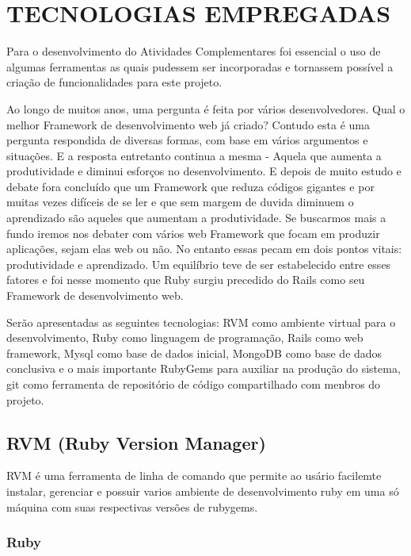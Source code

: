 \chapter{TECNOLOGIAS EMPREGADAS}
\thispagestyle{empty}

Para o desenvolvimento do Atividades Complementares foi essencial o uso de algumas ferramentas as quais pudessem ser incorporadas  e tornassem possível a criação de funcionalidades para este projeto.

Ao longo de muitos anos, uma pergunta é feita por vários desenvolvedores. Qual o melhor Framework de desenvolvimento web já criado? Contudo esta é uma pergunta respondida de diversas formas, com base em vários argumentos e situações. E a resposta entretanto continua a mesma - Aquela que aumenta a produtividade e diminui esforços no  desenvolvimento. E depois de muito estudo e debate fora concluído que um Framework que reduza códigos gigantes e por muitas vezes difíceis de se ler e que sem margem de duvida diminuem o aprendizado são aqueles que aumentam a produtividade. Se buscarmos mais a fundo iremos nos debater com vários web Framework que focam em produzir aplicações, sejam elas web ou não. No entanto essas pecam em dois pontos vitais: produtividade e aprendizado. Um equilíbrio teve de ser estabelecido entre esses fatores e foi nesse momento que Ruby surgiu precedido do Rails como seu Framework de desenvolvimento web.

Serão apresentadas as seguintes tecnologias:
RVM como ambiente virtual para o desenvolvimento, Ruby como linguagem de programação, Rails como web framework, Mysql como base de dados inicial, MongoDB como base de dados conclusiva e o mais importante RubyGems para auxiliar na produção do sistema, git como ferramenta de repositório de código compartilhado com menbros do projeto.


\section{RVM (Ruby Version Manager)}

RVM é uma ferramenta de linha de comando que permite ao usário facilemte instalar, gerenciar e possuir varios ambiente de desenvolvimento ruby em uma só máquina com suas respectivas versões de rubygems.


\subsection{Ruby}
\label{Rvm}

